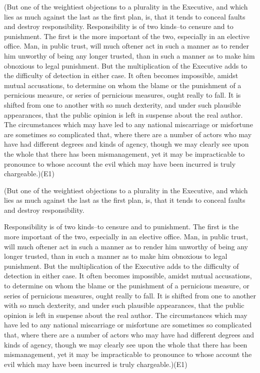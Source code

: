 (But one of the weightiest objections to a plurality in the Executive, and which lies as much against the last as the first plan, is, that it tends to conceal faults and destroy responsibility. 
Responsibility is of two kinds--to censure and to punishment. 
The first is the more important of the two, especially in an elective office. 
Man, in public trust, will much oftener act in such a manner as to render him unworthy of being any longer trusted, than in such a manner as to make him obnoxious to legal punishment. 
But the multiplication of the Executive adds to the difficulty of detection in either case. 
It often becomes impossible, amidst mutual accusations, to determine on whom the blame or the punishment of a pernicious measure, or series of pernicious measures, ought really to fall. 
It is shifted from one to another with so much dexterity, and under such plausible appearances, that the public opinion is left in suspense about the real author. 
The circumstances which may have led to any national miscarriage or misfortune are sometimes so complicated that, where there are a number of actors who may have had different degrees and kinds of agency, though we may clearly see upon the whole that there has been mismanagement, yet it may be impracticable to pronounce to whose account the evil which may have been incurred is truly chargeable.)(E1)

(But one of the weightiest objections to a plurality in the Executive, and which lies as much against the last as the first plan, is, that it tends to conceal faults and destroy responsibility.

Responsibility is of two kinds--to censure and to punishment. 
The first is the more important of the two, especially in an elective office. 
Man, in public trust, will much oftener act in such a manner as to render him unworthy of being any longer trusted, than in such a manner as to make him obnoxious to legal punishment. 
But the multiplication of the Executive adds to the difficulty of detection in either case. 
It often becomes impossible, amidst mutual accusations, to determine on whom the blame or the punishment of a pernicious measure, or series of pernicious measures, ought really to fall. 
It is shifted from one to another with so much dexterity, and under such plausible appearances, that the public opinion is left in suspense about the real author. 
The circumstances which may have led to any national miscarriage or misfortune are sometimes so complicated that, where there are a number of actors who may have had different degrees and kinds of agency, though we may clearly see upon the whole that there has been mismanagement, yet it may be impracticable to pronounce to whose account the evil which may have been incurred is truly chargeable.)(E1)

